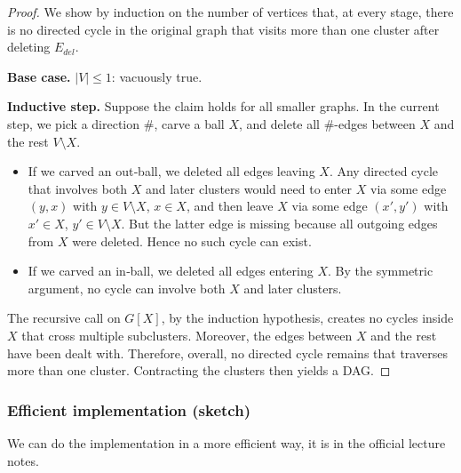 \begin{proof}
    We show by induction on the number of vertices that, at every stage, there is no directed cycle in the original graph that visits more than one cluster after deleting $E_{del}$.
    
    \textbf{Base case.} $|V| \le 1$: vacuously true.
    
    \textbf{Inductive step.} Suppose the claim holds for all smaller graphs. In the current step, we pick a direction $\#$, carve a ball $X$, and delete all $\#$-edges between $X$ and the rest $V \setminus X$.
    \begin{itemize}
        \item If we carved an out‑ball, we deleted all edges leaving $X$. Any directed cycle that involves both $X$ and later clusters would need to enter $X$ via some edge $(y, x)$ with $y \in V \setminus X$, $x \in X$, and then leave $X$ via some edge $(x', y')$ with $x' \in X$, $y' \in V \setminus X$. But the latter edge is missing because all outgoing edges from $X$ were deleted. Hence no such cycle can exist.
        \item If we carved an in‑ball, we deleted all edges entering $X$. By the symmetric argument, no cycle can involve both $X$ and later clusters.
    \end{itemize}
    The recursive call on $G[X]$, by the induction hypothesis, creates no cycles inside $X$ that cross multiple subclusters. Moreover, the edges between $X$ and the rest have been dealt with. Therefore, overall, no directed cycle remains that traverses more than one cluster. Contracting the clusters then yields a DAG.
\end{proof}

\subsubsection{Efficient implementation (sketch)}
We can do the implementation in a more efficient way, it is in the official lecture notes.